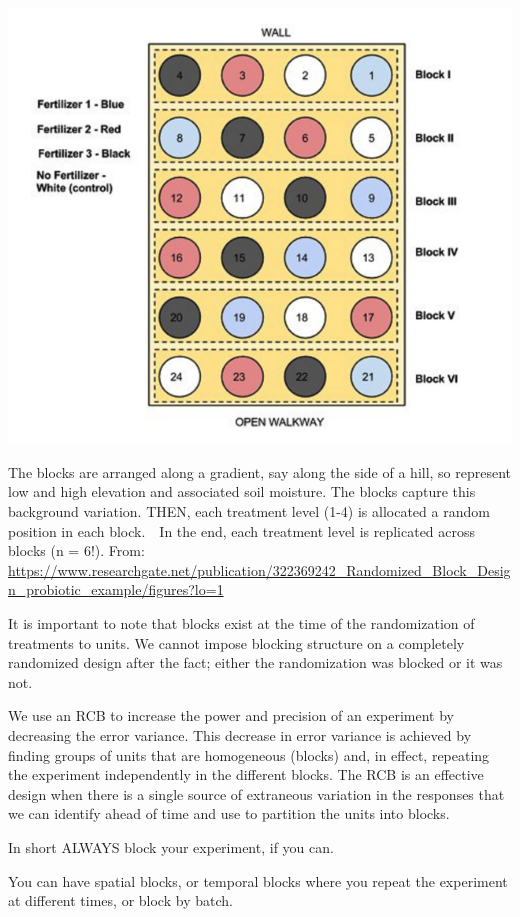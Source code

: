 \documentclass[
]{book}
\begin{document}
\includegraphics[width=8.89in]{images/BlockDesignGraphic}

The blocks are arranged along a gradient, say along the side of a hill, so represent low and high elevation and associated soil moisture. The blocks capture this background variation. THEN, each treatment level (1-4) is allocated a random position in each block.~~In the end, each treatment level is replicated across blocks (n = 6!). From: \url{https://www.researchgate.net/publication/322369242_Randomized_Block_Design_probiotic_example/figures?lo=1}

It is important to note that blocks exist at the time of the randomization of treatments to units. We cannot impose blocking structure on a completely randomized design after the fact; either the randomization was blocked or it was not.

We use an RCB to increase the power and precision of an experiment by decreasing the error variance. This decrease in error variance is achieved by finding groups of units that are homogeneous (blocks) and, in effect, repeating the experiment independently in the different blocks. The RCB is an effective design when there is a single source of extraneous variation in the responses that we can identify ahead of time and use to partition the units into blocks.

In short ALWAYS block your experiment, if you can.

You can have spatial blocks, or temporal blocks where you repeat the experiment at different times, or block by batch.
\end{document}
